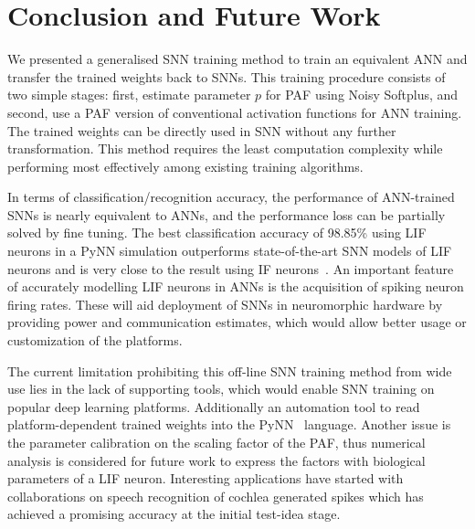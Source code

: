 \documentclass{article}
\begin{document}
	\section{Conclusion and Future Work}
	We presented a generalised SNN training method to train an equivalent ANN and transfer the trained weights back to SNNs.
	This training procedure consists of two simple stages: first, estimate parameter $p$ for PAF using Noisy Softplus, and second, use a PAF version of conventional activation functions for ANN training. %
	The trained weights can be directly used in SNN without any further transformation.
	This method requires the least computation complexity while performing most effectively among existing training algorithms.
	
	In terms of classification/recognition accuracy, the performance of ANN-trained SNNs is nearly equivalent to ANNs, and the performance loss can be partially solved by fine tuning.
	The best classification accuracy of 98.85\% using LIF neurons in a PyNN simulation outperforms state-of-the-art SNN models of LIF neurons and is very close to the result using IF neurons~\cite{diehl2015fast}.
	An important feature of accurately modelling LIF neurons in ANNs is the acquisition of spiking neuron firing rates. These will aid deployment of SNNs in neuromorphic hardware by providing power and communication estimates, which would allow better usage or customization of the platforms.
	
	The current limitation prohibiting this off-line SNN training method from wide use lies in the lack of supporting tools, which would enable SNN training on popular deep learning platforms. Additionally an automation tool to read platform-dependent trained weights into the PyNN~\cite{davison2008pynn} language.
	Another issue is the parameter calibration on the scaling factor of the PAF, thus numerical analysis is considered for future work to express the factors with biological parameters of a LIF neuron.
	Interesting applications have started with collaborations on speech recognition of cochlea generated spikes which has achieved a promising accuracy at the initial test-idea stage.
	
\end{document}
